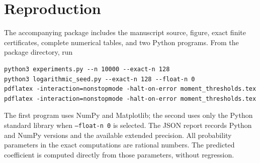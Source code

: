 \documentclass[11pt,a4paper]{article}
\numberwithin{equation}{section}
\begin{document}
\section{Reproduction}
The accompanying package includes the manuscript source, figure, exact
finite certificates, complete numerical tables, and two Python programs.
From the package directory, run
\begin{verbatim}
python3 experiments.py --n 10000 --exact-n 128
python3 logarithmic_seed.py --exact-n 128 --float-n 0
pdflatex -interaction=nonstopmode -halt-on-error moment_thresholds.tex
pdflatex -interaction=nonstopmode -halt-on-error moment_thresholds.tex
\end{verbatim}
The first program uses NumPy and Matplotlib; the second uses only the
Python standard library when \texttt{--float-n 0} is selected. The JSON
report records Python and NumPy versions and the available extended
precision. All probability parameters in the exact computations are
rational numbers. The predicted coefficient is computed directly from
those parameters, without regression.
\end{document}
